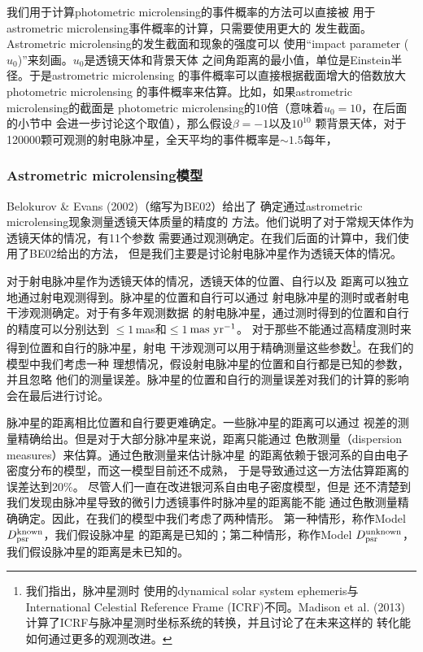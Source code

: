 我们用于计算photometric microlensing的事件概率的方法可以直接被
用于astrometric microlensing事件概率的计算，只需要使用更大的
发生截面。Astrometric microlensing的发生截面和现象的强度可以
使用“impact parameter ($u_0$)”来刻画。$u_0$是透镜天体和背景天体
之间角距离的最小值，单位是Einstein半径。于是astrometric microlensing
的事件概率可以直接根据截面增大的倍数放大photometric microlensing
的事件概率来估算。比如，如果astrometric microlensing的截面是
photometric microlensing的10倍（意味着$u_0=10$，在后面的小节中
会进一步讨论这个取值），那么假设$\beta=-1$以及$10^{10}$
颗背景天体，对于120000颗可观测的射电脉冲星，全天平均的事件概率是$\sim1.5$每年，

\subsubsection{Astrometric microlensing模型}

Belokurov \& Evans (2002)\supercite{Bel}（缩写为BE02）给出了
确定通过astrometric microlensing现象测量透镜天体质量的精度的
方法。他们说明了对于常规天体作为透镜天体的情况，有11个参数
需要通过观测确定。在我们后面的计算中，我们使用了BE02给出的方法，
但是我们主要是讨论射电脉冲星作为透镜天体的情况。

对于射电脉冲星作为透镜天体的情况，透镜天体的位置、自行以及
距离可以独立地通过射电观测得到。脉冲星的位置和自行可以通过
射电脉冲星的测时或者射电干涉观测确定。对于有多年观测数据
的射电脉冲星，通过测时得到的位置和自行的精度可以分别达到
$\leq 1$\,mas和$\leq 1$\,$\rm{mas\ yr^{-1}}$\supercite{verbiest}。
对于那些不能通过高精度测时来得到位置和自行的脉冲星，射电
干涉观测可以用于精确测量这些参数\footnote{我们指出，脉冲星测时
使用的dynamical solar system ephemeris与International Celestial 
Reference Frame (ICRF)不同。Madison et al. (2013)\supercite{Madison13}
计算了ICRF与脉冲星测时坐标系统的转换，并且讨论了在未来这样的
转化能如何通过更多的观测改进。}。在我们的模型中我们考虑一种
理想情况，假设射电脉冲星的位置和自行都是已知的参数，并且忽略
他们的测量误差。脉冲星的位置和自行的测量误差对我们的计算的影响
会在最后进行讨论。

脉冲星的距离相比位置和自行要更难确定。一些脉冲星的距离可以通过
视差的测量精确给出。但是对于大部分脉冲星来说，距离只能通过
色散测量（dispersion measures）来估算。通过色散测量来估计脉冲星
的距离依赖于银河系的自由电子密度分布的模型，而这一模型目前还不成熟，
于是导致通过这一方法估算距离的误差达到20\%\supercite{Taylor}。
尽管人们一直在改进银河系自由电子密度模型\supercite{cordes}，但是
还不清楚到我们发现由脉冲星导致的微引力透镜事件时脉冲星的距离能不能
通过色散测量精确确定。因此，在我们的模型中我们考虑了两种情形。
第一种情形，称作Model $D_{\rm{psr}}^{\rm{known}}$，我们假设脉冲星
的距离是已知的；第二种情形，称作Model $D_{\rm{psr}}^{\rm{unknown}}$，
我们假设脉冲星的距离是未已知的。

